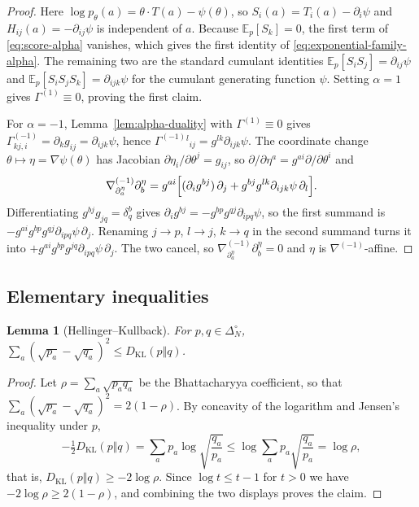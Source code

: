 \documentclass[11pt]{article}
\newtheorem{lemma}[theorem]{Lemma}
\theoremstyle{definition}
\theoremstyle{remark}
\newcommand{\simplex}{\Delta_{N}^{\circ}}
\newcommand{\E}{\mathbb{E}}
\newcommand{\KL}{D_{\mathrm{KL}}}
\begin{document}
\begin{proof}
Here $\log p_\theta(a)=\theta\cdot T(a)-\psi(\theta)$, so
$S_i(a)=T_i(a)-\partial_i\psi$ and $H_{ij}(a)=-\partial_{ij}\psi$ is
independent of $a$. Because $\E_p[S_k]=0$, the first term of
\eqref{eq:score-alpha} vanishes, which gives the first identity of
\eqref{eq:exponential-family-alpha}. The remaining two are the standard
cumulant identities $\E_p[S_iS_j]=\partial_{ij}\psi$ and
$\E_p[S_iS_jS_k]=\partial_{ijk}\psi$ for the cumulant generating function
$\psi$. Setting $\alpha=1$ gives $\Gamma^{(1)}\equiv0$, proving the first
claim.

For $\alpha=-1$, Lemma~\ref{lem:alpha-duality} with $\Gamma^{(1)}\equiv0$ gives
$\Gamma^{(-1)}_{kj,i}=\partial_kg_{ij}=\partial_{ijk}\psi$, hence
$\Gamma^{(-1)}{}^l{}_{ij}=g^{lk}\partial_{ijk}\psi$. The coordinate change
$\theta\mapsto\eta=\nabla\psi(\theta)$ has Jacobian
$\partial\eta_i/\partial\theta^j=g_{ij}$, so
$\partial/\partial\eta^a=g^{ai}\partial/\partial\theta^i$ and
\begin{equation}
    \nabla^{(-1)}_{\partial^\eta_a}\partial^\eta_b
    =g^{ai}\Bigl[
        (\partial_ig^{bj})\,\partial_j
        +g^{bj}g^{lk}\partial_{ijk}\psi\,\partial_l
      \Bigr].
\end{equation}
Differentiating $g^{bj}g_{jq}=\delta^b_q$ gives
$\partial_ig^{bj}=-g^{bp}g^{qj}\partial_{ipq}\psi$, so the first summand is
$-g^{ai}g^{bp}g^{qj}\partial_{ipq}\psi\,\partial_j$. Renaming $j\to p$,
$l\to j$, $k\to q$ in the second summand turns it into
$+g^{ai}g^{bp}g^{jq}\partial_{ipq}\psi\,\partial_j$. The two cancel, so
$\nabla^{(-1)}_{\partial^\eta_a}\partial^\eta_b=0$ and $\eta$ is
$\nabla^{(-1)}$-affine.
\end{proof}

\subsection{Elementary inequalities}

\begin{lemma}[Hellinger--Kullback]\label{lem:hellinger-kl}
For $p,q\in\simplex$,
$\sum_a(\sqrt{p_a}-\sqrt{q_a})^2\le\KL(p\Vert q)$.
\end{lemma}

\begin{proof}
Let $\rho=\sum_a\sqrt{p_aq_a}$ be the Bhattacharyya coefficient, so that
$\sum_a(\sqrt{p_a}-\sqrt{q_a})^2=2(1-\rho)$. By concavity of the logarithm and
Jensen's inequality under $p$,
\begin{equation}
    -\tfrac12\KL(p\Vert q)
    =\sum_ap_a\log\sqrt{\frac{q_a}{p_a}}
    \le\log\sum_ap_a\sqrt{\frac{q_a}{p_a}}
    =\log\rho ,
\end{equation}
that is, $\KL(p\Vert q)\ge-2\log\rho$. Since $\log t\le t-1$ for $t>0$ we have
$-2\log\rho\ge2(1-\rho)$, and combining the two displays proves the claim.
\end{proof}
\end{document}
